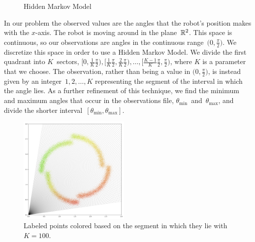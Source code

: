 \documentclass[twoside]{article}
\begin{document}
\begin{figure}[h]
  \centering
  \caption{Hidden Markov Model}\label{fig:hmm}
\end{figure}

In our problem the observed values are the angles that the robot's position makes with the $x$-axis.
The robot is moving around in the plane~$\mathbb{R}^2$.
This space is continuous, so our observations are angles in the continuous range~$\big(0, \frac{\pi}{2}\big)$.
We discretize this space in order to use a Hidden Markov Model.
We divide the first quadrant into $K$~sectors, ${\textstyle \big[0, \frac{1}{K}\frac{\pi}{2}\big), \big[\frac{1}{K}\frac{\pi}{2}, \frac{2}{K}\frac{\pi}{2}\big), \ldots, \big[\frac{K - 1}{K}\frac{\pi}{2}, \frac{\pi}{2}\big)}$, where $K$ is a parameter that we choose.
The observation, rather than being a value in $\big(0, \frac{\pi}{2}\big)$, is instead given by an integer~${1, 2, \ldots, K}$ representing the segment of the interval in which the angle lies.
As a further refinement of this technique, we find the minimum and maximum angles that occur in the observations file, $\theta_{\text{min}}$~and~$\theta_{\text{max}}$, and divide the shorter interval~$[\theta_{\text{min}}, \theta_{\text{max}}]$.
\begin{figure}
  \begin{center}
    \includegraphics[width=0.48\textwidth]{images/angle-discrete}
    \caption{Labeled points colored based on the segment in which they lie with~${K = 100}$.}
  \end{center}
\end{figure}
\end{document}
